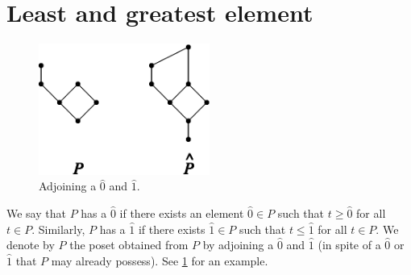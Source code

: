 \section{Least and greatest element}
\label{tree:poset:leastandgreatest}

\begin{figure}
	\centering
	\includegraphics[width=0.5\textwidth]{fig/stanley/3-3}
	\caption{\label{fig:stanley:3-3} Adjoining a $\hat{0}$ and $\hat{1}$. \cite{Stanley:2011:ECV:2124415}}
\end{figure}


We say that $P$ has a $\hat{0}$ if there exists an element $\hat{0} \in P$ such that $t \geq \hat{0}$ for all $t \in P$. Similarly, $P$ has a $\hat{1}$ if there exists $\hat{1} \in P$ such that $t \leq \hat{1}$ for all $t \in P$. We denote by $P$ the poset obtained from $P$ by adjoining a $\hat{0}$ and $\hat{1}$ (in spite of a $\hat{0}$ or $\hat{1}$ that $P$ may already possess). See \ref{fig:stanley:3-3} for an example. \cite{Stanley:2011:ECV:2124415}



